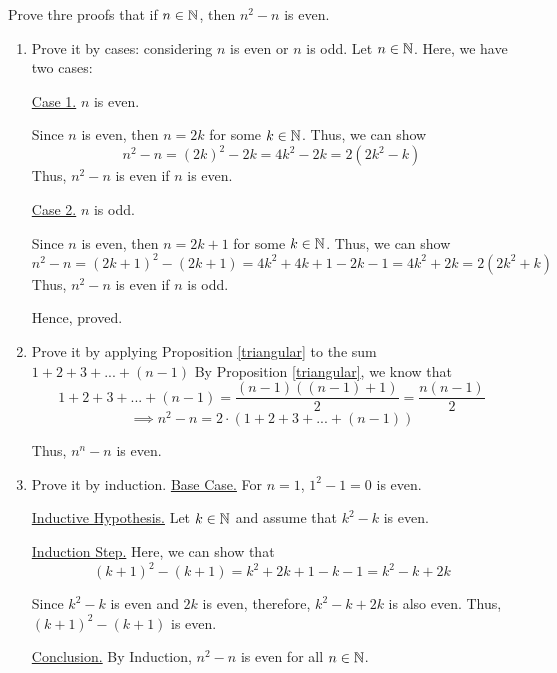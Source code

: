 \bp Prove thre proofs that if $n \in \mathbb{N}$, then $n^2 - n$ is even.
\begin{enumerate}
	\item Prove it by cases: considering $n$ is even or $n$ is odd.
		\bs
		Let $n \in \mathbb{N}$. Here, we have two cases:

		\underline{Case 1.} $n$ is even. 

		Since $n$ is even, then $n = 2k$ for some $k \in \mathbb{N}$. 
		Thus, we can show
		$$n^2 - n = (2k)^2 - 2k = 4k^2 - 2k = 2(2k^2-k)$$
		Thus, $n^2 - n$ is even if $n$ is even.

		\underline{Case 2.} $n$ is odd. 

		Since $n$ is even, then $n = 2k+1$ for some $k \in \mathbb{N}$. 
		Thus, we can show
		$$n^2 - n = (2k+1)^2 - (2k+1) = 4k^2 + 4k + 1 - 2k - 1 = 4k^2 + 2k = 2(2k^2 + k)$$
		Thus, $n^2 - n$ is even if $n$ is odd.

		Hence, proved.
		\es


	\item Prove it by applying Proposition \ref{triangular} to the sum $1 + 2 + 3 + ... + (n-1)$
		\bs
		By Proposition \ref{triangular}, we know that 
		$$1 + 2 + 3 + ... + (n-1) = \frac{(n-1)((n-1)+1)}{2} = \frac{n(n-1)}{2}$$
		$$\implies n^2 - n = 2 \cdot (1 + 2 + 3 + ... + (n-1))$$

		Thus, $n^n - n$ is even.
		\es
		
	\item Prove it by induction.
		\bs
		\underline{Base Case.} For $n = 1$, $1^2 - 1 = 0$ is even.

		\underline{Inductive Hypothesis.} Let $k \in \mathbb{N}$ and assume that $k^2 - k$ is even.

		\underline{Induction Step.} Here, we can show that 
		$$(k+1)^2 - (k+1) = k^2 + 2k + 1 - k - 1 = k^2 - k + 2k$$

		Since $k^2 - k$ is even and $2k$ is even, therefore, $k^2 - k + 2k$ is also even.
		Thus, $(k+1)^2 - (k+1)$ is even.

		\underline{Conclusion.} By Induction, $n^2 - n$ is even for all $n \in \mathbb{N}$.
		\es
\end{enumerate}
\ep



